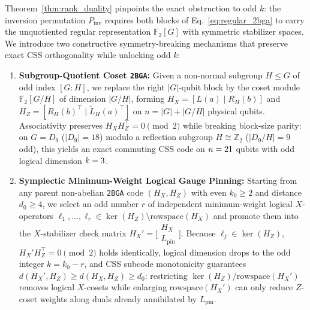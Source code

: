 \documentclass[aps,prapplied,reprint,longbibliography]{revtex4-2}
\begin{document}
Theorem~\ref{thm:rank_duality} pinpoints the exact obstruction to odd $k$: the inversion permutation $P_{\mathrm{inv}}$ requires both blocks of Eq.~\eqref{eq:regular_2bga} to carry the unquotiented regular representation $\mathbb{F}_2[G]$ with symmetric stabilizer spaces. We introduce two constructive symmetry-breaking mechanisms that preserve exact CSS orthogonality while unlocking odd $k$:
\begin{enumerate}
\item \textbf{Subgroup-Quotient Coset \texttt{2BGA}:} Given a non-normal subgroup $H \le G$ of odd index $[G:H]$, we replace the right $|G|$-qubit block by the coset module $\mathbb{F}_2[G/H]$ of dimension $|G/H|$, forming $H_X = [L(a) \mid R_H(b)]$ and $H_Z = [R_H(b)^\top \mid \widetilde{L}_H(a)^\top]$ on $n = |G| + |G/H|$ physical qubits. Associativity preserves $H_X H_Z^\top = 0 \pmod 2$ while breaking block-size parity: on $G = D_9$ ($|D_9|=18$) modulo a reflection subgroup $H \cong \mathbb{Z}_2$ ($|D_9/H|=9$ odd), this yields an exact commuting CSS code on $n = 21{}$ qubits with odd logical dimension $k = 3{}$.
\item \textbf{Symplectic Minimum-Weight Logical Gauge Pinning:} Starting from any parent non-abelian \texttt{2BGA} code $(H_X, H_Z)$ with even $k_0 \ge 2$ and distance $d_0 \ge 4$, we select an odd number $r$ of independent minimum-weight logical $X$-operators $\ell_1, \dots, \ell_r \in \ker(H_Z) \setminus \mathrm{rowspace}(H_X)$ and promote them into the $X$-stabilizer check matrix $H_X' = \bigl[\begin{smallmatrix} H_X \\ L_{\mathrm{pin}} \end{smallmatrix}\bigr]$. Because $\ell_j \in \ker(H_Z)$, $H_X' H_Z^\top = 0 \pmod 2$ holds identically, logical dimension drops to the odd integer $k = k_0 - r$, and CSS subcode monotonicity guarantees $d(H_X', H_Z) \ge d(H_X, H_Z) \ge d_0$: restricting $\ker(H_Z)/\mathrm{rowspace}(H_X')$ removes logical $X$-cosets while enlarging $\mathrm{rowspace}(H_X')$ can only reduce $Z$-coset weights along duals already annihilated by $L_{\mathrm{pin}}$.
\end{enumerate}
\end{document}
